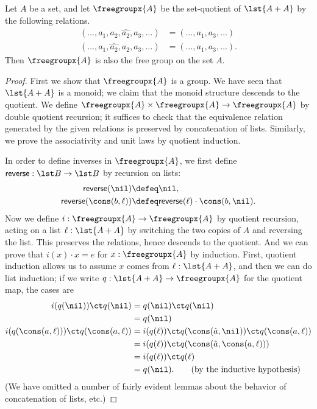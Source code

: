 \begin{thm}
  Let $A$ be a set, and let $\freegroupx{A}$ be the set-quotient of $\lst{A+A}$ by the following relations.
  \begin{align*}
    (\dots,a_1,a_2,\widehat{a_2},a_3,\dots) &=
    (\dots,a_1,a_3,\dots)\\
    (\dots,a_1,\widehat{a_2},a_2,a_3,\dots) &=
    (\dots,a_1,a_3,\dots).
  \end{align*}
  Then $\freegroupx{A}$ is also the free group on the set $A$.
\end{thm}
\begin{proof}
  First we show that $\freegroupx{A}$ is a group.
  We have seen that $\lst{A+A}$ is a monoid; we claim that the monoid structure descends to the quotient.
  We define $\freegroupx{A} \times \freegroupx{A} \to \freegroupx{A}$ by double quotient recursion; it suffices to check that the equivalence relation generated by the given relations is preserved by concatenation of lists.
  Similarly, we prove the associativity and unit laws by quotient induction.

  In order to define inverses in $\freegroupx{A}$, we first define $\mathsf{reverse}:\lst B\to\lst B$ by recursion on lists:
  \begin{align*}
    \mathsf{reverse}(\nil) &\defeq \nil,\\
    \mathsf{reverse}(\cons(b,\ell))&\defeq \mathsf{reverse}(\ell)\cdot \cons(b,\nil).
  \end{align*}
  Now we define $i:\freegroupx{A}\to \freegroupx{A}$ by quotient recursion, acting on a list $\ell:\lst{A+A}$ by switching the two copies of $A$ and reversing the list.
  This preserves the relations, hence descends to the quotient.
  And we can prove that $i(x) \cdot x = e$ for $x:\freegroupx{A}$ by induction.
  First, quotient induction allows us to assume $x$ comes from $\ell:\lst{A+A}$, and then we can do list induction; if we write $q:\lst{A+A}\to \freegroupx{A}$ for the quotient map, the cases are
  \begin{align*}
    i(q(\nil)) \ct q(\nil) &= q(\nil) \ct q(\nil)\\
    &= q(\nil)\\
    i(q(\cons(a,\ell))) \ct q(\cons(a,\ell)) &= i(q(\ell)) \ct q(\cons(\hat{a},\nil)) \ct q(\cons(a,\ell))\\
    &= i(q(\ell)) \ct q(\cons(\hat{a},\cons(a,\ell)))\\
    &= i(q(\ell)) \ct q(\ell)\\
    &= q(\nil). \tag{by the inductive hypothesis}
  \end{align*}
  (We have omitted a number of fairly evident lemmas about the behavior of concatenation of lists, etc.)


\end{proof}
